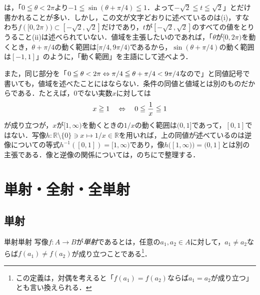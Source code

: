 \begin{remark}[「範囲」を述べるときの注意]
  は，「$0 \leqq \theta < 2\pi$より$-1 \leqq \sin(\theta + \pi/4) \leqq 1$．よって$-\sqrt{2} \leqq t \leqq \sqrt{2}$」とだけ書かれることが多い．しかし，この文が文字どおりに述べているのは(i)，すなわち$f([0, 2\pi)) \subset [-\sqrt{2}, \sqrt{2}]$だけであり，$t$が$[-\sqrt{2}, \sqrt{2}]$のすべての値をとりうること(ii)は述べられていない．値域を主張したいのであれば，「$\theta$が$[0, 2\pi)$を動くとき，$\theta + \pi/4$の動く範囲は$[\pi/4, 9\pi/4)$であるから，$\sin(\theta + \pi/4)$の動く範囲は$[-1, 1]$」のように，「動く範囲」を主語にして述べよう．

  また，同じ部分を「$0 \leqq \theta < 2\pi \mathrel{\Leftrightarrow} \pi/4 \leqq \theta + \pi/4 < 9\pi/4$なので」と同値記号で書いても，値域を述べたことにはならない．条件の同値と値域とは別のものだからである．たとえば，$0$でない実数$x$に対しては
  \[
    x \geqq 1 \quad \lequiv \quad 0 \leqq \frac{1}{x} \leqq 1
  \]
  が成り立つが，$x$が$[1, \infty)$を動くときの$1/x$の動く範囲は$(0, 1]$であって，$[0, 1]$ではない．写像$h \colon \mathbb{R} \setminus \{0\} \ni x \mapsto 1/x \in \mathbb{R}$を用いれば，上の同値が述べているのは逆像についての等式$h^{-1}([0, 1]) = [1, \infty)$であり，像$h([1, \infty)) = (0, 1]$とは別の主張である．像と逆像の関係については，のちにで整理する．
\end{remark}



\section{単射・全射・全単射}

\subsection{単射}

\begin{definition}{単射}{単射}
  写像$f \colon A \to B$が\emph{単射}であるとは，任意の$a_1, a_2 \in A$に対して，$a_1 \ne a_2$ならば$f(a_1) \ne f(a_2)$が成り立つことである\footnote{この定義は，対偶を考えると「$f(a_1) =f(a_2)$ならば$a_1=a_2$が成り立つ」とも言い換えられる．}．
\end{definition}

